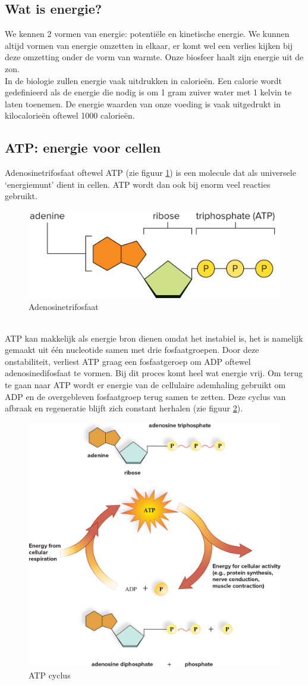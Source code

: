 \documentclass[a4paper,kul]{kulakarticle} %
\begin{document}
\subsection{Wat is energie?}
We kennen 2 vormen van energie: potentiële en kinetische energie. We kunnen altijd vormen van energie omzetten in elkaar, er komt wel een verlies kijken bij deze omzetting onder de vorm van warmte. Onze biosfeer haalt zijn energie uit de zon.
\\
In de biologie zullen energie vaak uitdrukken in calorieën. Een calorie wordt gedefinieerd als de energie die nodig is om 1 gram zuiver water met 1 kelvin te laten toenemen. De energie waarden van onze voeding is vaak uitgedrukt in kilocalorieën oftewel 1000 calorieën. 
\newpage
\subsection{ATP: energie voor cellen}
Adenosinetrifosfaat oftewel ATP (zie figuur \ref{fig:atp}) is een molecule dat als universele `energiemunt' dient in cellen. ATP wordt dan ook bij enorm veel reacties gebruikt.
\begin{figure}[h]
	\centering
	\includegraphics[width=0.7\linewidth]{ATP}
	\caption[APT]{Adenosinetrifosfaat}
	\label{fig:atp}
\end{figure}\\
ATP kan makkelijk als energie bron dienen omdat het instabiel is, het is namelijk gemaakt uit één nucleotide samen met drie fosfaatgroepen. Door deze onstabiliteit, verliest ATP graag een fosfaatgeroep om ADP oftewel adenosinedifosfaat te vormen. Bij dit proces komt heel wat energie vrij. Om terug te gaan naar ATP wordt er energie van de cellulaire ademhaling gebruikt om ADP en de overgebleven fosfaatgroep terug samen te zetten. Deze cyclus van afbraak en regeneratie blijft zich constant herhalen (zie figuur \ref{fig:atpcycle}).
\begin{figure}[h]
	\centering
	\includegraphics[width=0.65\linewidth]{ATPcycle}
	\caption[ATP cylcus]{ATP cyclus}
	\label{fig:atpcycle}
\end{figure}\\
\end{document}
